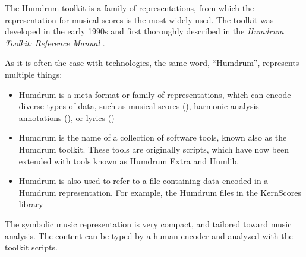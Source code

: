 


The Humdrum toolkit is a family of representations, from
which the  representation for musical scores is
the most widely used. The toolkit was developed in the early
1990s and first thoroughly described in the \emph{Humdrum
Toolkit: Reference Manual} \parencite{huron1994humdrum}.

As it is often the case with technologies, the same word,
``Humdrum'', represents multiple things:

\begin{itemize}
    \item Humdrum is a meta-format or family of
    representations, which can encode diverse types of data,
    such as musical scores (), harmonic
    analysis annotations (), or lyrics
    ()
    \item Humdrum is the name of a collection of software
    tools, known also as the Humdrum toolkit. These tools
    are originally  scripts, which have now been
    extended with  tools known as Humdrum Extra and
    Humlib.
    \item Humdrum is also used to refer to a file containing
    data encoded in a Humdrum representation. For example,
    the Humdrum files in the KernScores library
    \parencite{sapp2005online} \end{itemize}


The  symbolic music representation is very
compact, and tailored toward music analysis. The content can
be typed by a human encoder and analyzed with the toolkit
scripts.
